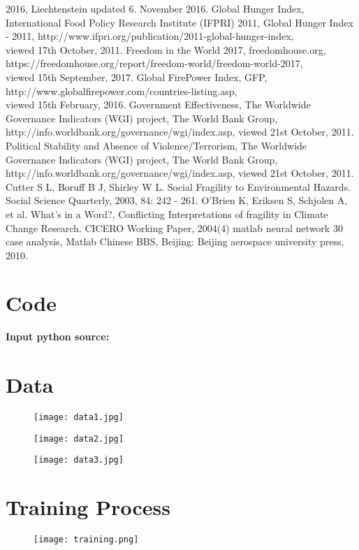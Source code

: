 \documentclass{mcmthesis}
\begin{document}
\begin{thebibliography}{99}
2016, Liechtenstein updated 6. November 2016.
 Global Hunger Index, International Food Policy Research Institute 
(IFPRI) 2011, Global Hunger Index - 2011,
http://www.ifpri.org/publication/2011-global-hunger-index, \\ 
viewed 17th October, 2011.
 Freedom in the World 2017, freedomhouse.org,\\ 
https://freedomhouse.org/report/freedom-world/freedom-world-2017, \\ 
viewed 15th September, 2017.
 Global FirePower Index, GFP,
http://www.globalfirepower.com/countries-listing.asp, \\ 
viewed 15th February, 2016.
 Government Effectiveness, The Worldwide Governance 
Indicators (WGI) project, The World Bank Group, 
http://info.worldbank.org/governance/wgi/index.asp, viewed 21st October, 2011.
 Political Stability and Absence of Violence/Terrorism, 
The Worldwide Governance Indicators (WGI) project, The World Bank Group, \\
http://info.worldbank.org/governance/wgi/index.asp, viewed 21st October, 2011.
 Cutter S L, Boruff B J, Shirley W L. Social 
Fragility to Environmental Hazards. Social Science 
Quarterly, 2003, 84: 242 - 261.
 O’Brien K, Eriksen S, Schjolen A, et al. What’s in a Word?, 
Conflicting Interpretations of fragility in Climate Change Research. CICERO Working Paper, 2004(4)
 matlab neural network 30 case analysis, Matlab Chinese BBS, Beijing: Beijing aerospace university press, 2010.
\end{thebibliography}

\begin{appendices}

\section{Code}

\textbf{\textcolor[rgb]{0.98,0.00,0.00}{Input python source:}}


\section{Data}
\begin{figure}[htbp]
  \centering
  \texttt{[image: data1.jpg]}
\end{figure}
\begin{figure}[htbp]
  \centering
  \texttt{[image: data2.jpg]}
\end{figure}
\begin{figure}[htbp]
  \centering
  \texttt{[image: data3.jpg]}
\end{figure}
\newpage
\section{Training Process}
\begin{figure}[htbp]
  \centering
  \texttt{[image: training.png]}
\end{figure}
\end{appendices}
\end{document}
